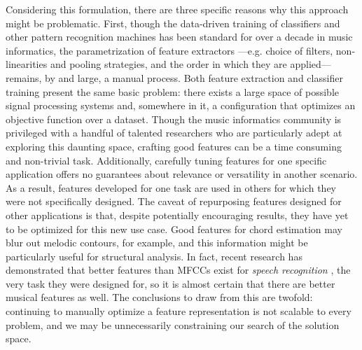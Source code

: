 Considering this formulation, there are three specific reasons why this approach might be problematic.
First, though the data-driven training of classifiers and other pattern recognition machines has been standard for over a decade in music informatics, the parametrization of feature extractors ---e.g. choice of filters, non-linearities and pooling strategies, and the order in which they are applied--- remains, by and large, a manual process.
Both feature extraction and classifier training present the same basic problem: there exists a large space of possible signal processing systems and, somewhere in it, a configuration that optimizes an objective function over a dataset.
Though the music informatics community is privileged with a handful of talented researchers who are particularly adept at exploring this daunting space, crafting good features can be a time consuming and non-trivial task.
Additionally, carefully tuning features for one specific application offers no guarantees about relevance or versatility in another scenario.
As a result, features developed for one task are used in others for which they were not specifically designed.
The caveat of repurposing features designed for other applications is that, despite potentially encouraging results, they have yet to be optimized for this new use case.
Good features for chord estimation may blur out melodic contours, for example, and this information might be particularly useful for structural analysis.
In fact, recent research has demonstrated that better features than MFCCs exist for \emph{speech recognition} \cite{Hinton2012}, the very task they were designed for, so it is almost certain that there are better musical features as well.
The conclusions to draw from this are twofold: continuing to manually optimize a feature representation is not scalable to every problem, and we may be unnecessarily constraining our search of the solution space.


